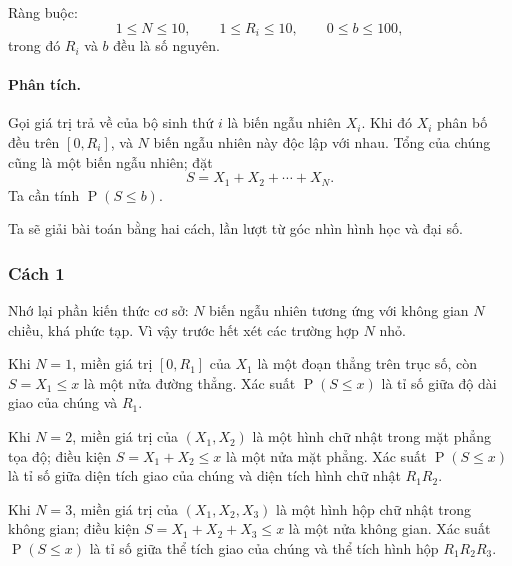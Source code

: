 \documentclass[11pt]{article}
\newcommand{\Prob}{\operatorname{P}}
\begin{document}
Ràng buộc:
\[
  1\le N\le 10,\qquad
  1\le R_i\le 10,\qquad
  0\le b\le 100,
\]
trong đó \(R_i\) và \(b\) đều là số nguyên.

\paragraph{Phân tích.}
Gọi giá trị trả về của bộ sinh thứ \(i\) là biến ngẫu nhiên \(X_i\). Khi đó
\(X_i\) phân bố đều trên \([0,R_i]\), và \(N\) biến ngẫu nhiên này độc lập với
nhau. Tổng của chúng cũng là một biến ngẫu nhiên; đặt
\[
  S=X_1+X_2+\cdots+X_N.
\]
Ta cần tính \(\Prob(S\le b)\).

Ta sẽ giải bài toán bằng hai cách, lần lượt từ góc nhìn hình học và đại số.

\subsubsection{Cách 1}

Nhớ lại phần kiến thức cơ sở: \(N\) biến ngẫu nhiên tương ứng với không gian
\(N\) chiều, khá phức tạp. Vì vậy trước hết xét các trường hợp \(N\) nhỏ.

Khi \(N=1\), miền giá trị \([0,R_1]\) của \(X_1\) là một đoạn thẳng trên trục
số, còn \(S=X_1\le x\) là một nửa đường thẳng. Xác suất \(\Prob(S\le x)\) là
tỉ số giữa độ dài giao của chúng và \(R_1\).

\begin{center}
\end{center}

Khi \(N=2\), miền giá trị của \((X_1,X_2)\) là một hình chữ nhật trong mặt
phẳng tọa độ; điều kiện \(S=X_1+X_2\le x\) là một nửa mặt phẳng. Xác suất
\(\Prob(S\le x)\) là tỉ số giữa diện tích giao của chúng và diện tích hình chữ
nhật \(R_1R_2\).

Khi \(N=3\), miền giá trị của \((X_1,X_2,X_3)\) là một hình hộp chữ nhật trong
không gian; điều kiện \(S=X_1+X_2+X_3\le x\) là một nửa không gian. Xác suất
\(\Prob(S\le x)\) là tỉ số giữa thể tích giao của chúng và thể tích hình hộp
\(R_1R_2R_3\).
\end{document}
